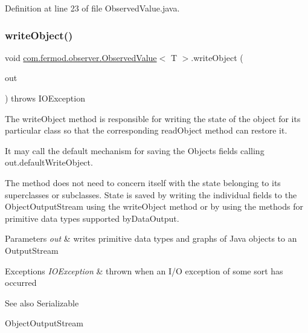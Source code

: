 Definition at line 23 of file Observed\+Value.\+java.

\mbox{\label{classcom_1_1fermod_1_1observer_1_1ObservedValue_ae1d53d3762867c30fb44fdfdfa320d8c}} 
\subsubsection{\texorpdfstring{writeObject()}{writeObject()}}
{\footnotesize\ttfamily void \mbox{\hyperlink{classcom_1_1fermod_1_1observer_1_1ObservedValue}{com.\+fermod.\+observer.\+Observed\+Value}}$<$ T $>$.write\+Object (\begin{DoxyParamCaption}\item[{Object\+Output\+Stream}]{out }\end{DoxyParamCaption}) throws I\+O\+Exception\hspace{0.3cm}{\ttfamily [private]}}



The {\ttfamily write\+Object} method is responsible for writing the state of the object for its particular class so that the corresponding {\ttfamily read\+Object} method can restore it. 

It may call the default mechanism for saving the Object\textquotesingle{}s fields calling {\ttfamily out.\+default\+Write\+Object}. 

The method does not need to concern itself with the state belonging to its superclasses or subclasses. State is saved by writing the individual fields to the {\ttfamily Object\+Output\+Stream} using the {\ttfamily write\+Object} method or by using the methods for primitive data types supported by{\ttfamily  Data\+Output}.


\begin{DoxyParams}{Parameters}
{\em out} & writes primitive data types and graphs of Java objects to an Output\+Stream \\
\hline
\end{DoxyParams}

\begin{DoxyExceptions}{Exceptions}
{\em I\+O\+Exception} & thrown when an I/O exception of some sort has occurred \\
\hline
\end{DoxyExceptions}
\begin{DoxySeeAlso}{See also}
Serializable 

Object\+Output\+Stream 
\end{DoxySeeAlso}


